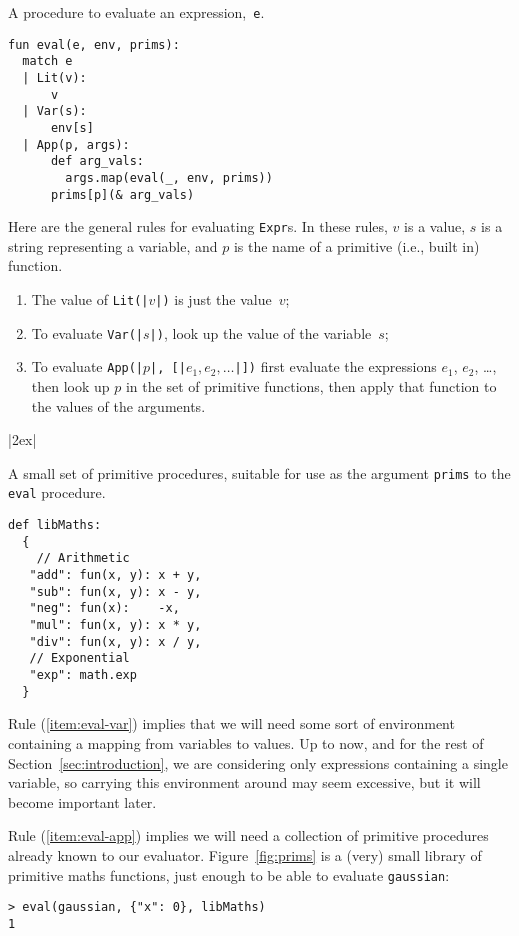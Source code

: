 \documentclass[11pt, a4paper]{article}
\newcommand{\cd}[1]{\texttt{#1}}
\begin{document}
\begin{marginfigure}
  \caption[Eval procedure]{A procedure to evaluate an expression,~\cd{e}.}
\footnotesize
\begin{verbatim}
fun eval(e, env, prims):
  match e
  | Lit(v):         
      v
  | Var(s):         
      env[s]
  | App(p, args):
      def arg_vals:
        args.map(eval(_, env, prims))
      prims[p](& arg_vals)
\end{verbatim}
\end{marginfigure}
Here are the general rules for evaluating \cd{Expr}s. In these rules,
$v$ is a value, $s$ is a string representing a variable, and $p$ is
the name of a primitive (i.e., built in) function.
\begin{enumerate}
\item The value of \cd{Lit(|$v$|)} is just the value~$v$;
\item To evaluate \cd{Var(|$s$|)}, look up the value of the
  variable~$s$;\label{item:eval-var}
\item To evaluate \cd{App(|$p$|, [|$e_1, e_2, \dotsc$|])} first
  evaluate the expressions $e_1$, $e_2$, \dots, then look
  up $p$ in the set of primitive functions, then apply that function to
  the values of the arguments.\label{item:eval-app}
\end{enumerate}

\begin{marginfigure}|2ex|
  \caption{A small set of primitive procedures, suitable for use as
    the argument \cd{prims} to the \cd{eval} procedure.\label{fig:prims}}
\footnotesize
\begin{verbatim}
def libMaths:
  {
    // Arithmetic 
   "add": fun(x, y): x + y, 
   "sub": fun(x, y): x - y,
   "neg": fun(x):    -x,
   "mul": fun(x, y): x * y,
   "div": fun(x, y): x / y,
   // Exponential
   "exp": math.exp
  }
\end{verbatim}
\end{marginfigure}Rule (\ref{item:eval-var}) implies that we will need some sort of
environment containing a mapping from variables to values. Up to now,
and for the rest of Section~\ref{sec:introduction}, we are considering
only expressions containing a single variable, so carrying this
environment around may seem excessive, but it will become important
later.

Rule (\ref{item:eval-app}) implies we will need a collection of
primitive procedures already known to our
evaluator. Figure~\ref{fig:prims} is a (very) small library of
primitive maths functions, just enough to be able to evaluate
\cd{gaussian}:
\begin{verbatim}
> eval(gaussian, {"x": 0}, libMaths)
1
\end{verbatim}
\end{document}
